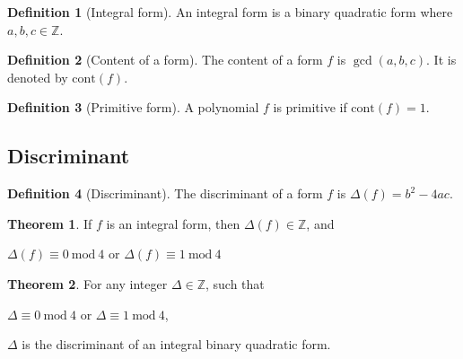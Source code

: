 \documentclass{article}
\theoremstyle{definition}
\newtheorem{definition}{Definition}[section]
\theoremstyle{theorem}
\newtheorem{theorem}{Theorem}[section]
\theoremstyle{example}
\theoremstyle{corollary}
\begin{document}
\theoremstyle{definition}
\begin{definition}[Integral form]
An integral form is a binary quadratic form where \(a, b, c \in \mathbb{Z}\).
\end{definition}

\bigskip

\theoremstyle{definition}
\begin{definition}[Content of a form]
The content of a form \(f\) is \(\gcd(a, b, c)\). It is denoted by \(\textrm{cont}(f)\).
\end{definition}

\bigskip

\theoremstyle{definition}
\begin{definition}[Primitive form]
A polynomial \(f\) is primitive if \(\textrm{cont}(f) = 1\).
\end{definition}

\bigskip

\subsection{Discriminant}

\bigskip

\theoremstyle{definition}
\begin{definition}[Discriminant]
The discriminant of a form \(f\) is \(\Delta(f) = b^{2} - 4ac\).
\end{definition}

\bigskip

\theoremstyle{theorem}
\begin{theorem}
If \(f\) is an integral form, then \(\Delta(f) \in \mathbb{Z}\), and
\begin{center}
\(\Delta(f) \equiv 0 \ \textrm{mod} \ 4\) \quad or \quad \(\Delta(f) \equiv 1 \ \textrm{mod} \ 4\)
\end{center}
\end{theorem}

\bigskip

\theoremstyle{theorem}
\begin{theorem}
For any integer \(\Delta \in \mathbb{Z}\), such that
\begin{center}
\(\Delta \equiv 0 \ \textrm{mod} \ 4\) \quad or \quad \(\Delta \equiv 1 \ \textrm{mod} \ 4\),
\end{center}
\(\Delta\) is the discriminant of an integral binary quadratic form.
\end{theorem}

\bigskip
\end{document}
